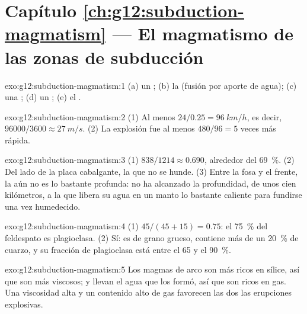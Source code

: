 \section*{Capítulo \ref{ch:g12:subduction-magmatism} --- El magmatismo de las zonas de subducción}

\begin{solution}{exo:g12:subduction-magmatism:1}
(a) un ; (b) la  (fusión por aporte de agua);
(c) una ; (d) un ; (e) el .
\end{solution}

\begin{solution}{exo:g12:subduction-magmatism:2}
(1) Al menos $24/0.25 = \qty{96}{km/h}$, es decir, $\num{96000}/3600 \approx
\qty{27}{m/s}$. (2) La explosión fue al menos $480/96 = 5$ veces más rápida.
\end{solution}

\begin{solution}{exo:g12:subduction-magmatism:3}
(1) $838/1214 \approx 0.690$, alrededor del \qty{69}{\percent}. (2) Del lado
de la placa cabalgante, la que no se hunde. (3) Entre la fosa y el frente, la
 aún no es lo bastante profunda: no ha alcanzado la profundidad, de unos
cien kilómetros, a la que libera su agua en un manto lo bastante caliente para
fundirse una vez humedecido.
\end{solution}

\begin{solution}{exo:g12:subduction-magmatism:4}
(1) $45/(45 + 15) = 0.75$: el \qty{75}{\percent} del feldespato es
plagioclasa. (2) Sí: es de grano grueso, contiene más de un
\qty{20}{\percent} de cuarzo, y su fracción de plagioclasa está entre el 65 y
el \qty{90}{\percent}.
\end{solution}

\begin{solution}{exo:g12:subduction-magmatism:5}
Los magmas de arco son más ricos en sílice, así que son más viscosos; y llevan
el agua que los formó, así que son ricos en gas. Una viscosidad alta y un
contenido alto de gas favorecen las dos las erupciones explosivas.
\end{solution}

